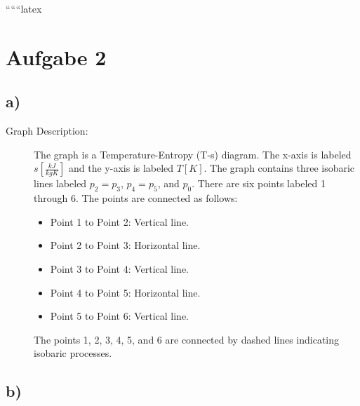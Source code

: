 
``````latex


\section*{Aufgabe 2}

\subsection*{a)}

\begin{description}
    \item[Graph Description:] The graph is a Temperature-Entropy (T-s) diagram. The x-axis is labeled $s \left[ \frac{kJ}{kgK} \right]$ and the y-axis is labeled $T[K]$. The graph contains three isobaric lines labeled $p_2 = p_3$, $p_4 = p_5$, and $p_0$. There are six points labeled 1 through 6. The points are connected as follows:
    \begin{itemize}
        \item Point 1 to Point 2: Vertical line.
        \item Point 2 to Point 3: Horizontal line.
        \item Point 3 to Point 4: Vertical line.
        \item Point 4 to Point 5: Horizontal line.
        \item Point 5 to Point 6: Vertical line.
    \end{itemize}
    The points 1, 2, 3, 4, 5, and 6 are connected by dashed lines indicating isobaric processes.
\end{description}

\subsection*{b)}

